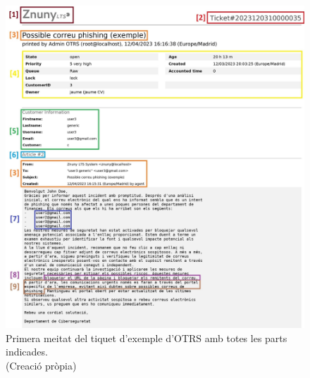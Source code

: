 \begin{figure}[H]
    \centering
    \includegraphics[width=\textwidth]{meitat-1.png}
    \caption[Primera meitat del tiquet d'exemple d'OTRS]{Primera meitat del tiquet d'exemple d'OTRS amb totes les parts indicades. \\ (Creació pròpia)}
    \label{fig:tiquet-exemple-1}
\end{figure}

